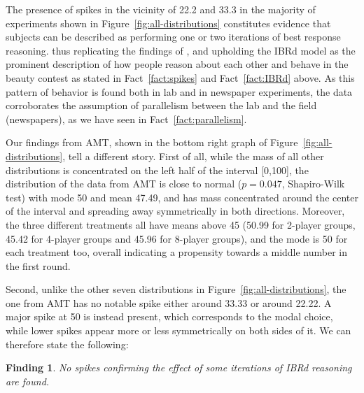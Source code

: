 \documentclass[12pt,review]{elsarticle}
\newtheorem{fdn}{Finding}
\begin{document}
The presence of spikes in the vicinity of 22.2 and 33.3 in the majority of experiments shown in Figure~\ref{fig:all-distributions} constitutes evidence that subjects can be described as performing one or two iterations of best response reasoning. thus replicating the
findings of \citet{Nagel95}, and upholding the IBRd model as the
prominent description of how people reason about each other
and behave in the beauty contest as stated in Fact~\ref{fact:spikes}
and Fact~\ref{fact:IBRd} above. As this pattern of behavior
is found both in lab and in newspaper experiments, the data
corroborates the assumption of parallelism between the lab and the
field (newspapers), as we have seen in Fact~\ref{fact:parallelism}.

Our findings from AMT, shown in the bottom right graph of Figure~\ref{fig:all-distributions},
tell a different story. First of all, while the mass of all other
distributions is concentrated on the left half of the interval {[}0,100{]},
the distribution of the data from AMT is close to normal ($p=0.047$, Shapiro-Wilk test) with mode 50 and mean 47.49, and has mass concentrated around the center of
the interval and spreading away symmetrically in both directions.
Moreover, the three different treatments all have means above 45 (50.99
for 2-player groups, 45.42 for 4-player groups and 45.96 for 8-player
groups), and the mode is 50 for each treatment too, overall indicating
a propensity towards a middle number in the first round.

Second, unlike the other seven distributions in Figure~\ref{fig:all-distributions},
the one from AMT has no notable spike either around 33.33 or around
22.22. A major spike at 50 is instead present, which corresponds to
the modal choice, while lower spikes appear more or less symmetrically
on both sides of it. We can therefore state the following:

\begin{fdn}
No spikes confirming the effect of some iterations of IBRd reasoning are found.
\end{fdn}

%
\end{document}
